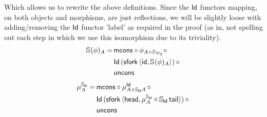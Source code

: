 \documentclass{article}
\begin{document}
Which allows us to rewrite the above definitions. Since the $\mathsf{Id}$ functors mapping, on both objects and morphisms, are just reflections, we will be slightly loose with adding/removing the $\mathsf{Id}$ functor 'label' as required in the proof (as in, not spelling out each step in which we use this isomorphism due to its triviality).
\begin{align*}
	\mathbb{S}_{}(\phi)_A =\,&\mathsf{mcons} \circ \phi_{A \times \mathbb{S}_{M_2}} \circ\, \\
	&\mathsf{Id}\,(\mathsf{sfork}\,\langle \mathsf{id}, \mathbb{S}_{}(\phi)_A \rangle)\, \circ\, \\ 
	&\mathsf{uncons}
\end{align*}
\begin{align*}
	\mu^{\mathbb{S}_{\mathsf{Id}}}_A =\, &\mathsf{mcons} \circ \mu^{\mathsf{Id}}_{A \times \mathbb{S}_{\mathsf{Id}}A}\, \circ\, \\
	&\mathsf{Id}\,(\mathsf{sfork}\,\langle \mathsf{head}, \mu^{\mathbb{S}_{\mathsf{Id}}}_A \circ \mathbb{S}_{\mathsf{Id}}\,\mathsf{tail} \rangle)\, \circ\, \\
	&\mathsf{uncons}
\end{align*}
\end{document}
